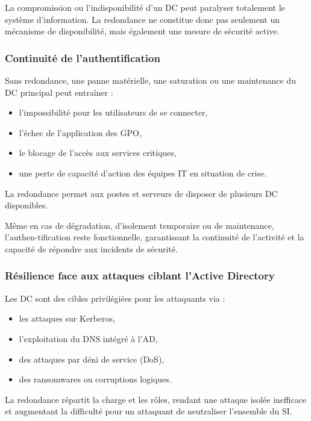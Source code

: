\noindent La compromission ou l’indisponibilité d’un DC peut paralyser totalement le système d’information. La redondance ne constitue donc pas seulement un mécanisme de disponibilité, mais également une mesure de sécurité active.

\subsubsection*{Continuité de l’authentification}
\noindent Sans redondance, une panne matérielle, une saturation ou une maintenance du DC principal peut entraîner :
\begin{itemize}
    \item l’impossibilité pour les utilisateurs de se connecter,
    \item l’échec de l’application des GPO,
    \item le blocage de l’accès aux services critiques,
    \item une perte de capacité d’action des équipes IT en situation de crise.
\end{itemize}

\noindent La redondance permet aux postes et serveurs de disposer de plusieurs DC disponibles.

\noindent Même en cas de dégradation, d’isolement temporaire ou de maintenance, l’authen-tification reste fonctionnelle, garantissant la continuité de l’activité et la capacité de répondre aux incidents de sécurité.

\subsubsection*{Résilience face aux attaques ciblant l’Active Directory}
\noindent Les DC sont des cibles privilégiées pour les attaquants via :
\begin{itemize}
    \item les attaques sur Kerberos,
    \item l’exploitation du DNS intégré à l’AD,
    \item des attaques par déni de service (DoS),
    \item des ransomwares ou corruptions logiques.
\end{itemize}
\noindent La redondance répartit la charge et les rôles, rendant une attaque isolée inefficace et augmentant la difficulté pour un attaquant de neutraliser l’ensemble du SI.

